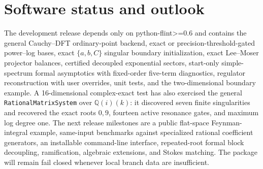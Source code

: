 \documentclass[11pt]{article}
\begin{document}
\section{Software status and outlook}

The development release depends only on python-flint>=0.6 and contains the general Cauchy--DFT
ordinary-point backend, exact or precision-threshold-gated power--log bases, exact
$\{a,b,C\}$ singular boundary initialization, exact Lee--Moser projector balances,
certified decoupled exponential sectors, start-only simple-spectrum formal asymptotics with
fixed-order five-term diagnostics, regulator reconstruction with user overrides, unit tests,
and the
two-dimensional boundary example.  A 16-dimensional complex-exact test has also exercised
the general \texttt{Rational}\allowbreak\texttt{Matrix}\allowbreak\texttt{System} over
$\mathbb Q(i)(k)$: it
discovered seven finite
singularities and recovered the exact roots $0,9$, fourteen active resonance gates, and
maximum log degree one.  The next release milestones are a public flat-space
Feynman-integral example, same-input benchmarks against specialized rational coefficient
generators, an installable command-line interface, repeated-root formal block decoupling,
ramification, algebraic extensions, and Stokes matching.  The package will remain fail
closed whenever local branch data are insufficient.

\enlargethispage{1.5\baselineskip}


\end{document}
